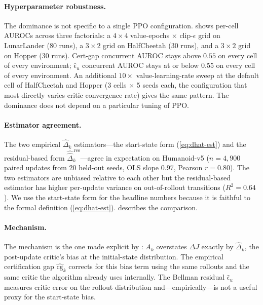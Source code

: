 \documentclass[11pt]{article}
\begin{document}
\paragraph{Hyperparameter robustness.}
The dominance is not specific to a single PPO configuration.  shows per-cell AUROCs across three factorials: a $4\times 4$ value-epochs $\times$ clip-$\epsilon$ grid on LunarLander ($80$ runs), a $3\times 2$ grid on HalfCheetah ($30$ runs), and a $3\times 2$ grid on Hopper ($30$ runs). Cert-gap concurrent AUROC stays above $0.55$ on every cell of every environment; $\widehat\epsilon_u$ concurrent AUROC stays at or below $0.55$ on every cell of every environment. An additional $10\times$ value-learning-rate sweep at the default cell of HalfCheetah and Hopper (3 cells $\times$ 5 seeds each, the configuration that most directly varies critic convergence rate) gives the same pattern. The dominance does not depend on a particular tuning of PPO.

\paragraph{Estimator agreement.}
The two empirical $\hat\Delta_k$ estimators---the start-state form (\ref{eq:dhat-est}) and the residual-based form $\widehat{\hat\Delta}^{\,\mathrm{res}}_k$---agree in expectation on Humanoid-v5 ($n{=}4{,}900$ paired updates from 20 held-out seeds, OLS slope $0.97$, Pearson $r = 0.80$). The two estimators are unbiased relative to each other but the residual-based estimator has higher per-update variance on out-of-rollout transitions ($R^2 = 0.64$). We use the start-state form for the headline numbers because it is faithful to the formal definition (\ref{eq:dhat-est}).  describes the comparison.

\paragraph{Mechanism.}
The mechanism is the one made explicit by : $A_k$ overstates $\Delta J$ exactly by $\hat\Delta_k$, the post-update critic's bias at the initial-state distribution. The empirical certification gap $\widehat{\mathrm{cg}}_k$ corrects for this bias term using the same rollouts and the same critic the algorithm already uses internally. The Bellman residual $\widehat\epsilon_u$ measures critic error on the rollout distribution and---empirically---is not a useful proxy for the start-state bias.
\end{document}
